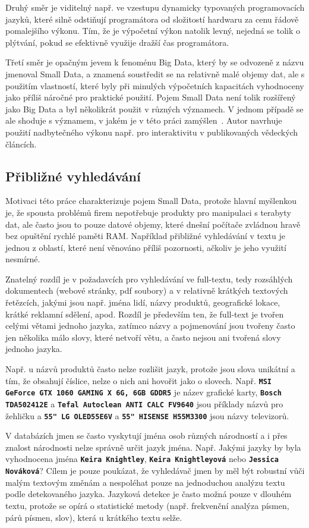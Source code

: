 \documentclass[11pt,letterpaper,oneside,openright]{book}
\newcommand{\bftt}[1]{\texttt{\textbf{#1}}}
\begin{document}
Druhý směr je viditelný např. ve vzestupu dynamicky typovaných programovacích
jazyků, které silně odstiňují programátora od složitostí hardwaru za cenu
řádově pomalejšího výkonu. Tím, že je výpočetní výkon natolik levný, nejedná se
tolik o plýtvání, pokud se efektivně využije dražší čas programátora.

Třetí směr je opačným jevem k fenoménu Big Data, který by se odvozeně z názvu
jmenoval Small Data, a znamená soustředit se na relativně malé objemy dat, ale
s použitím vlastností, které byly při minulých výpočetních kapacitách
vyhodnoceny jako příliš náročné pro praktické použití. Pojem Small Data není
tolik rozšířený jako Big Data a byl několikrát použit v různých významech. V
jednom případě se ale shoduje s významem, v jakém je v této práci
zamýšlen~\cite{small_data}. Autor navrhuje použití nadbytečného výkonu např.
pro interaktivitu v publikovaných vědeckých článcích.

\subsection{Přibližné vyhledávání}
Motivaci této práce charakterizuje pojem Small Data, protože hlavní myšlenkou
je, že spousta problémů firem nepotřebuje produkty pro manipulaci s terabyty
dat, ale často jsou to pouze datové objemy, které dnešní počítače zvládnou
hravě bez opuštění rychlé paměti RAM. Například přibližné vyhledávání v textu
je jednou z oblastí, které není věnováno příliš pozornosti, ačkoliv je jeho
využití nesmírné.

Znatelný rozdíl je v požadavcích pro vyhledávání ve full-textu, tedy rozsáhlých
dokumentech (webové stránky, pdf soubory) a v relativně krátkých textových
řetězcích, jakými jsou např. jména lidí, názvy produktů, geografické lokace,
krátké reklamní sdělení, apod. Rozdíl je především ten, že full-text je tvořen
celými větami jednoho jazyka, zatímco názvy a pojmenování jsou tvořeny často
jen několika málo slovy, které netvoří větu, a často nejsou ani tvořená slovy
jednoho jazyka.

Např. u názvů produktů často nelze rozlišit jazyk, protože jsou slova unikátní
a tím, že obsahují číslice, nelze o nich ani hovořit jako o slovech. Např.
\bftt{MSI GeForce GTX 1060 GAMING X 6G, 6GB GDDR5} je název grafické karty,
\bftt{Bosch TDA502412E} a \bftt{Tefal Autoclean ANTI CALC FV9640} jsou příklady
názvů pro žehličku a \bftt{55" LG OLED55E6V} a \bftt{55" HISENSE H55M3300} jsou
názvy televizorů.

V databázích jmen se často vyskytují jména osob různých národností a i přes
znalost národnosti nelze správně určit jazyk jména. Např. Jakými jazyky by byla
vyhodnocena jména \bftt{Keira Knightley}, \bftt{Keira Knightleyová} nebo
\bftt{Jessica Nováková}? Cílem je pouze poukázat, že vyhledávač jmen by měl být
robustní vůči malým textovým změnám a nespoléhat pouze na jednoduchou analýzu
textu podle detekovaného jazyka. Jazyková detekce je často možná pouze v
dlouhém textu, protože se opírá o statistické metody (např. frekvenční analýza
písmen, párů písmen, slov), která u krátkého textu selže.
\end{document}
